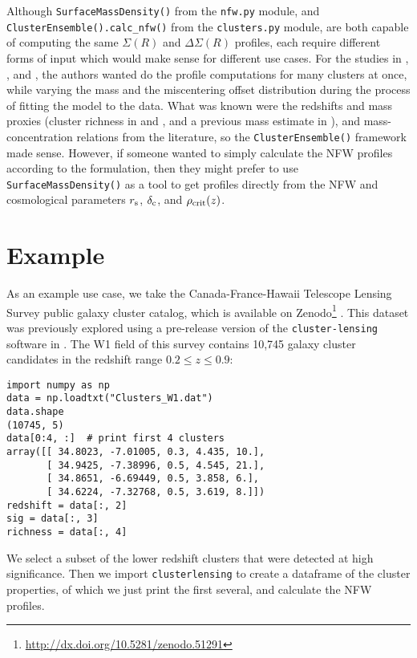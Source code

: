 \documentclass[twocolumn]{aastex6}
\newcommand{\code}{\lstinline[style=codeintext]}
\begin{document}
Although \code{SurfaceMassDensity()} from the \code{nfw.py} module, and \code{ClusterEnsemble().calc_nfw()} from the \code{clusters.py} module, are both capable of computing the same $\Sigma(R)$ and $\Delta\Sigma(R)$ profiles, each require different forms of input which would make sense for different use cases. For the studies in \citet{Ford15}, \citet{Ford14}, and \citet{Ford12}, the authors wanted do the profile computations for many clusters at once, while varying the mass and the miscentering offset distribution during the process of fitting the model to the data. What was known were the redshifts and mass proxies (cluster richness in \citealt{Ford15} and \citealt{Ford14}, and a previous mass estimate in \citealt{Ford12}), and mass-concentration relations from the literature, so the \code{ClusterEnsemble()} framework made sense. However, if someone wanted to simply calculate the NFW profiles according to the \citet{Wright00} formulation, then they might prefer to use \code{SurfaceMassDensity()} as a tool to get profiles directly from the NFW and cosmological parameters $r_{\rm s}$, $\delta_{\rm c}$, and $\rho_{\rm crit}(z)$.


\section{Example}
\label{ex}
As an example use case, we take the Canada-France-Hawaii Telescope Lensing Survey \citep[CFHTLenS;][]{Heymans12, Erben13} public galaxy cluster catalog, which is available on Zenodo\footnote{\url{http://dx.doi.org/10.5281/zenodo.51291}} \citep{3DMFcatalog}. This dataset was previously explored using a pre-release version of the \code{cluster-lensing} software in \citet{Ford14, Ford15}. The W1 field of this survey contains 10,745 galaxy cluster candidates in the redshift range $0.2 \le z \le 0.9$:

\begin{lstlisting}
import numpy as np
data = np.loadtxt("Clusters_W1.dat")
data.shape
(10745, 5)
data[0:4, :]  # print first 4 clusters
array([[ 34.8023, -7.01005, 0.3, 4.435, 10.],
       [ 34.9425, -7.38996, 0.5, 4.545, 21.],
       [ 34.8651, -6.69449, 0.5, 3.858, 6.],
       [ 34.6224, -7.32768, 0.5, 3.619, 8.]])
redshift = data[:, 2]
sig = data[:, 3]
richness = data[:, 4]
\end{lstlisting}

We select a subset of the lower redshift clusters that were detected at high significance. Then we import \code{clusterlensing} to create a dataframe of the cluster properties, of which we just print the first several, and calculate the NFW profiles.
\end{document}
